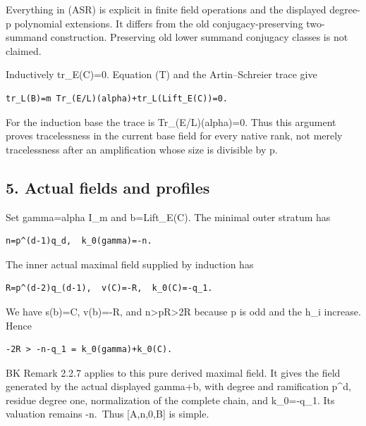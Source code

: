 Everything in (ASR) is explicit in finite field operations and the
displayed degree-p polynomial extensions. It differs from the old
conjugacy-preserving two-summand construction. Preserving old lower
summand conjugacy classes is not claimed.

Inductively tr\_E(C)=0. Equation (T) and the Artin--Schreier trace give

\begin{Verbatim}[fontsize=\small,breaklines=true,breakanywhere=true]
tr_L(B)=m Tr_(E/L)(alpha)+tr_L(Lift_E(C))=0.
\end{Verbatim}

For the induction base the trace is Tr\_(E/L)(alpha)=0. Thus this
argument proves tracelessness in the current base field for every native
rank, not merely tracelessness after an amplification whose size is
divisible by p.

\hypertarget{odd_tower-actual-fields-and-profiles}{%
\subsection{5. Actual fields and
profiles}\label{odd_tower-actual-fields-and-profiles}}

Set gamma=alpha I\_m and b=Lift\_E(C). The minimal outer stratum has

\begin{Verbatim}[fontsize=\small,breaklines=true,breakanywhere=true]
n=p^(d-1)q_d,  k_0(gamma)=-n.
\end{Verbatim}

The inner actual maximal field supplied by induction has

\begin{Verbatim}[fontsize=\small,breaklines=true,breakanywhere=true]
R=p^(d-2)q_(d-1),  v(C)=-R,  k_0(C)=-q_1.
\end{Verbatim}

We have s(b)=C, v(b)=-R, and n\textgreater pR\textgreater2R because p is
odd and the h\_i increase. Hence

\begin{Verbatim}[fontsize=\small,breaklines=true,breakanywhere=true]
-2R > -n-q_1 = k_0(gamma)+k_0(C).
\end{Verbatim}

BK Remark 2.2.7 applies to this pure derived maximal field. It gives the
field generated by the actual displayed gamma+b, with degree and
ramification p\^{}d, residue degree one, normalization of the complete
chain, and k\_0=-q\_1. Its valuation remains -n.~Thus {[}A,n,0,B{]} is
simple.

